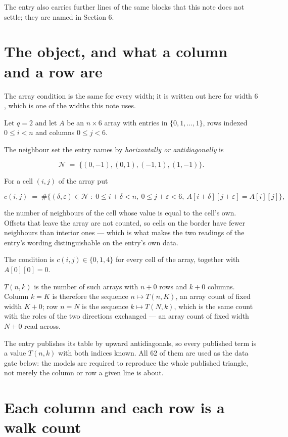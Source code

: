 \documentclass[11pt]{article}
\theoremstyle{definition}
\begin{document}
The entry also carries further lines of the same blocks that this note does not settle; they are named in Section 6.

\section{The object, and what a column and a row are}

The array condition is the same for every width; it is written out here for width $6$, which is one of the widths this note uses.

Let $q = 2$ and let $A$ be an $n \times 6$ array with entries in $\{0,1,\dots,1\}$, rows indexed $0 \le i < n$ and columns $0 \le j < 6$.

The neighbour set the entry names by {\itshape horizontally or antidiagonally} is

\[\mathcal{N} \;=\; \{(0,-1), (0,1), (-1,1), (1,-1)\}.\]

For a cell $(i,j)$ of the array put

\[c(i,j) \;=\; \#\bigl\{(\delta,\varepsilon)\in\mathcal{N} \;:\; 0\le i+\delta<n,\ 0\le j+\varepsilon<6,\ A[i+\delta][j+\varepsilon] = A[i][j]\bigr\},\]

the number of neighbours of the cell whose value is equal to the cell's own. Offsets that leave the array are not counted, so cells on the border have fewer neighbours than interior ones --- which is what makes the two readings of the entry's wording distinguishable on the entry's own data.

The condition is $c(i,j) \in \{0, 1, 4\}$ for every cell of the array, together with $A[0][0]=0$.

$T(n,k)$ is the number of such arrays with $n + 0$ rows and $k + 0$ columns. Column $k = K$ is therefore the sequence $n \mapsto T(n,K)$, an array count of fixed width $K + 0$; row $n = N$ is the sequence $k \mapsto T(N,k)$, which is the same count with the roles of the two directions exchanged --- an array count of fixed width $N + 0$ read across.

The entry publishes its table by upward antidiagonals, so every published term is a value $T(n,k)$ with both indices known. All 62 of them are used as the data gate below: the models are required to reproduce the whole published triangle, not merely the column or row a given line is about.

\section{Each column and each row is a walk count}
\end{document}
